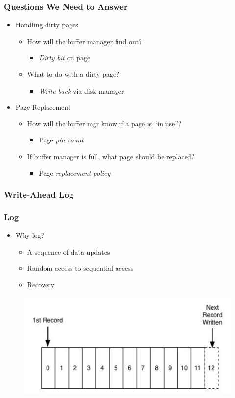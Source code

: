 \begin{frame}[fragile]
	\frametitle{Questions We Need to Answer}
	\begin{itemize}
		\item Handling dirty pages
		\begin{itemize}
			\item How will the buffer manager find out?
			\begin{itemize}
				\item \emph{Dirty bit} on page
			\end{itemize}
			\item What to do with a dirty page?
			\begin{itemize}
				\item \emph{Write back} via disk manager
			\end{itemize}
		\end{itemize}
		\item Page Replacement
		\begin{itemize}
			\item How will the buffer mgr know if a page is “in use”?
			\begin{itemize}
				\item Page \emph{pin count}
			\end{itemize}
			\item If buffer manager is full, what page should be replaced?
			\begin{itemize}
				\item Page \emph{replacement policy}
			\end{itemize}
		\end{itemize}
	\end{itemize}
\end{frame}

\subsubsection{Write-Ahead Log}

\begin{frame}[fragile]
	\frametitle{Log}
	\begin{itemize}
		\item Why log?
		\begin{itemize}
			\item A sequence of data updates
			\item Random access to sequential access
			\item Recovery
		\end{itemize}
	\end{itemize}
	\begin{figure}
		\includegraphics[width=.65\linewidth]{figs/dbfile-log.png}
	\end{figure}
\end{frame}

